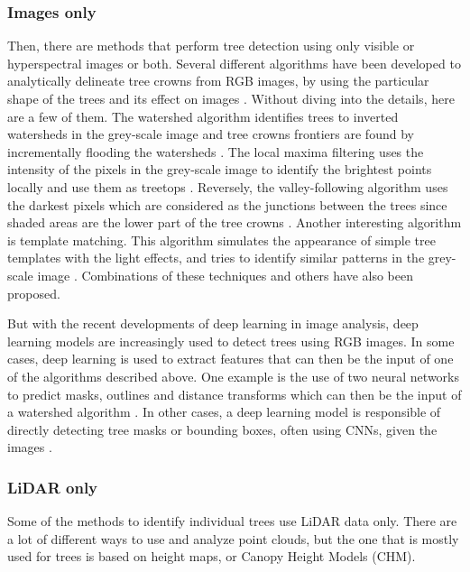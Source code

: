 \documentclass[
  letterpaper,
  DIV=11,
  numbers=noendperiod]{scrartcl}
\begin{document}
\subsubsection{Images only}\label{images-only}

Then, there are methods that perform tree detection using only visible
or hyperspectral images or both. Several different algorithms have been
developed to analytically delineate tree crowns from RGB images, by
using the particular shape of the trees and its effect on images
\autocite{rgb_analytical}. Without diving into the details, here are a
few of them. The watershed algorithm identifies trees to inverted
watersheds in the grey-scale image and tree crowns frontiers are found
by incrementally flooding the watersheds \autocite{watershed}. The local
maxima filtering uses the intensity of the pixels in the grey-scale
image to identify the brightest points locally and use them as treetops
\autocite{local-maximum}. Reversely, the valley-following algorithm uses
the darkest pixels which are considered as the junctions between the
trees since shaded areas are the lower part of the tree crowns
\autocite{valley-following}. Another interesting algorithm is template
matching. This algorithm simulates the appearance of simple tree
templates with the light effects, and tries to identify similar patterns
in the grey-scale image \autocite{template-matching}. Combinations of
these techniques and others have also been proposed.

But with the recent developments of deep learning in image analysis,
deep learning models are increasingly used to detect trees using RGB
images. In some cases, deep learning is used to extract features that
can then be the input of one of the algorithms described above. One
example is the use of two neural networks to predict masks, outlines and
distance transforms which can then be the input of a watershed algorithm
\autocite{rgb-dl-watershed}. In other cases, a deep learning model is
responsible of directly detecting tree masks or bounding boxes, often
using CNNs, given the images \autocite{DeepForest}.

\subsubsection{LiDAR only}\label{lidar-only}

Some of the methods to identify individual trees use LiDAR data only.
There are a lot of different ways to use and analyze point clouds, but
the one that is mostly used for trees is based on height maps, or Canopy
Height Models (CHM).
\end{document}
